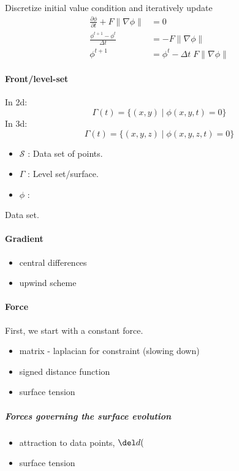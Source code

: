 \documentclass{article}
\begin{document}

Discretize initial value condition and iteratively update
\begin{align}
    \frac{\partial \phi}{\partial t} + F \|\nabla \phi\| &= 0 \\
    \frac{\phi^{t+1} - \phi^{t}}{\Delta t} &=  -F \|\nabla \phi\| \\
    \phi^{t+1} &= \phi^{t} - \Delta t \; F \|\nabla \phi\| 
\end{align}

\paragraph{Front/level-set}
In 2d:
\[
\Gamma(t) = \{(x,y) \; | \; \phi(x,y,t) = 0\}
\]
In 3d:
\[
\Gamma(t) = \{(x,y,z) \; | \; \phi(x,y,z,t) = 0\}
\]

\begin{itemize}
\item $\mathcal{S}$ : Data set of points.
\item $\Gamma$ : Level set/surface.
\item $\phi$ :
\end{itemize}

\Gamma
{} Data set.
\]
\paragraph{Gradient}
\begin{itemize}
\item central differences
\item upwind scheme
\end{itemize}

\paragraph{Force}
First, we start with a constant force.
\begin{itemize}
\item matrix - laplacian for constraint (slowing down)
\item signed distance function
\item surface tension
\end{itemize}

\subparagraph{Forces governing the surface evolution}
\begin{itemize}
\item attraction to data points, $\del d($
\item surface tension
\end{itemize}
\end{document}

